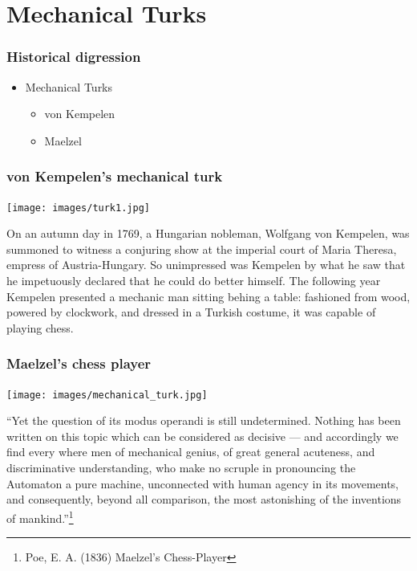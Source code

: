 \documentclass{beamer}
\begin{document}
\section{Mechanical Turks}
\label{sec-4}
\begin{frame}
\frametitle{Historical digression}
\label{sec-4_1}
\begin{itemize}

\item Mechanical Turks
\label{sec-4_1_1}%
\begin{itemize}
\item von Kempelen
\item Maelzel
\end{itemize}


\end{itemize} %
\end{frame}
\begin{frame}
\frametitle{von Kempelen's mechanical turk}
\label{sec-4_2}


  \texttt{[image: images/turk1.jpg]}

  On an autumn day in 1769, a Hungarian nobleman, Wolfgang von
  Kempelen, was summoned to witness a conjuring show at the imperial
  court of Maria Theresa, empress of Austria-Hungary. So unimpressed
  was Kempelen by what he saw that he impetuously declared that he
  could do better himself.  The following year Kempelen presented a
  mechanic man sitting behing a table: fashioned from wood, powered by
  clockwork, and dressed in a Turkish costume, it was capable of
  playing chess.
\end{frame}
\begin{frame}
\frametitle{Maelzel's chess player}
\label{sec-4_3}


  \texttt{[image: images/mechanical\_turk.jpg]}

  ``Yet the question of its modus operandi is still
  undetermined. Nothing has been written on this topic which can be
  considered as decisive — and accordingly we find every where men of
  mechanical genius, of great general acuteness, and discriminative
  understanding, who make no scruple in pronouncing the Automaton a
  pure machine, unconnected with human agency in its movements, and
  consequently, beyond all comparison, the most astonishing of the
  inventions of mankind.''\footnote{Poe, E. A. (1836) Maelzel's Chess-Player }
\end{frame}
\end{document}
